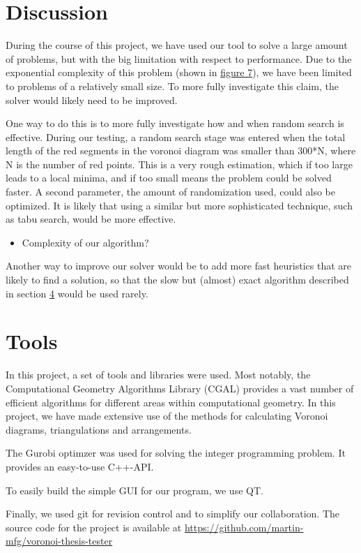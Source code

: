\documentclass[a4paper,12pt]{article}
\begin{document}
\section{Discussion}
During the course of this project, we have used our tool to solve a large amount of problems, but with the big limitation with respect to performance. Due to the exponential complexity of this problem (shown in \hyperref[ref:speed] {figure 7}), we have been limited to problems of a relatively small size. To more fully investigate this claim, the solver would likely need to be improved.

One way to do this is to more fully investigate how and when random search is effective. During our testing, a random search stage was entered when the total length of the red segments in the voronoi diagram was smaller than 300*N, where N is the number of red points. This is a very rough estimation, which if too large leads to a local minima, and if too small means the problem could be solved faster. A second parameter, the amount of randomization used, could also be optimized. It is likely that using a similar but more sophisticated technique, such as tabu search, would be more effective.


\begin{itemize}
\item
Complexity of our algorithm? 
\end{itemize}

Another way to improve our solver would be to add more fast heuristics that are likely to find a solution, so that the slow but (almost) exact algorithm described in section \hyperref[sec:findPoints]{4} would be used rarely.

\section{Tools}
In this project, a set of tools and libraries were used. Most notably, the Computational Geometry Algorithms Library (CGAL) provides a vast number of efficient algorithms for different areas within computational geometry. In this project, we have made extensive use of the methods for calculating Voronoi diagrams, triangulations and arrangements.

The Gurobi optimzer was used for solving the integer programming problem. It provides an easy-to-use C++-API.

To easily build the simple GUI for our program, we use QT.

Finally, we used git for revision control and to simplify our collaboration. The source code for the project is available at \url{https://github.com/martin-mfg/voronoi-thesis-tester}
\end{document}
